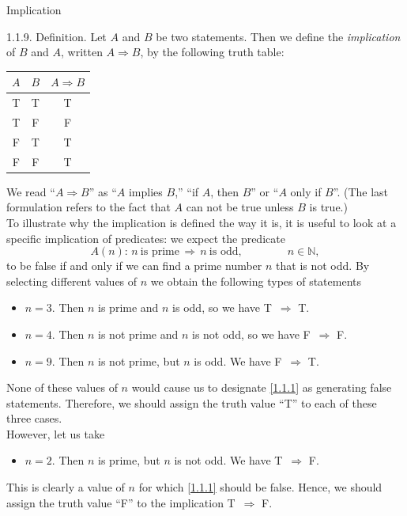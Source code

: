 \documentclass[smaller,hyperref={CJKbookmarks=true}]{beamer}
\newcommand{\N}{\mathbb{N}} \newcommand{\Z}{\mathbb{Z}} \newcommand{\Q}{\mathbb{Q}}
\begin{document}
\begin{frame}{Implication}
\begin{spacing}{1.05}
\alert{1.1.9. Definition.} Let $A$ and $B$ be two statements. Then we define the \emph{implication} of $B$ and $A$, written $A\Rightarrow B$, by the following truth table:
\begin{center}
\begin{tabular}{c|c|c}
  $A$ & $B$ & $A\Rightarrow B$ \\ \hline
  T & T & T \\
  T & F & F \\
  F & T & T \\
  F & F & T
\end{tabular}
\end{center}
We read ``$A\Rightarrow B$'' as ``$A$ implies $B$,'' ``if $A$, then $B$'' or ``$A$ only if $B$''. (The last formulation refers to the fact that $A$ can not be true unless $B$ is true.)\\[5pt]
To illustrate why the implication is defined the way it is, it is useful to look
at a specific implication of predicates: we expect the predicate
\begin{equation}\label{1.1.1}
  A(n)\!:\,n~\text{is prime}\,\Rightarrow\,n~\text{is odd},\qquad\qquad n\in\N,
\end{equation}
to be false if and only if we can find a prime number $n$ that is not odd.
\newpage
By selecting different values of $n$ we obtain the following types of
statements
\begin{itemize}
  \item $n=3$. Then $n$ is prime and $n$ is odd, so we have T~$\Rightarrow$ T.
  \item $n=4$. Then $n$ is not prime and $n$ is not odd, so we have F~$\Rightarrow$ F.
  \item $n=9$. Then $n$ is not prime, but $n$ is odd. We have F~$\Rightarrow$ T.
\end{itemize}
None of these values of $n$ would cause us to designate \eqref{1.1.1} as generating false statements. Therefore, we should assign the truth value ``T'' to each of these three cases.\\[5pt]
However, let us take
\begin{itemize}
  \item $n=2$. Then $n$ is prime, but $n$ is not odd. We have T~$\Rightarrow$ F.
\end{itemize}
This is clearly a value of $n$ for which \eqref{1.1.1} should be false. Hence, we should assign the truth value ``F'' to the implication T~$\Rightarrow$ F.
\end{spacing}
\end{frame}
\end{document}
